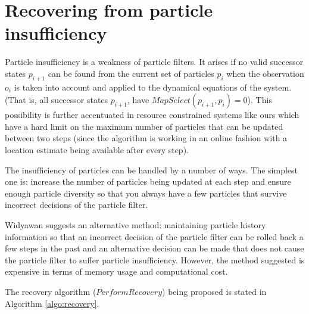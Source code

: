 \section{Recovering from particle insufficiency}

Particle insufficiency is a weakness of particle filters. It arises if 
no valid successor states $p_{i+1}$ can be found from the current set of 
particles $p_i$ when the observation $o_i$ is taken into account and applied 
to the dynamical equations of the system. (That is, all successor states 
$p_{i+1}$, have $MapSelect(p_{i+1}, p_i) = 0$). This possibility is 
further accentuated in resource constrained systems like ours which 
have a hard limit on the maximum number of particles that can be 
updated between two steps (since the algorithm is working in an online
fashion with a location estimate being available after every step).

The insufficiency of particles can be handled by a number of ways. 
The simplest one is: increase the number of particles being updated at each 
step and ensure enough particle diversity so that you always have 
a few particles that survive incorrect decisions of the particle filter. 

Widyawan \cite{Widyawan} suggests an alternative method: maintaining particle
history information so that an incorrect decision of the particle filter can be
rolled back a few steps in the past and an alternative decision can be made that
does not cause the particle filter to suffer particle insufficiency. However,
the method suggested is expensive in terms of memory usage and computational
cost.

The recovery algorithm ($PerformRecovery$) being proposed is stated in 
Algorithm \ref{algo:recovery}.


